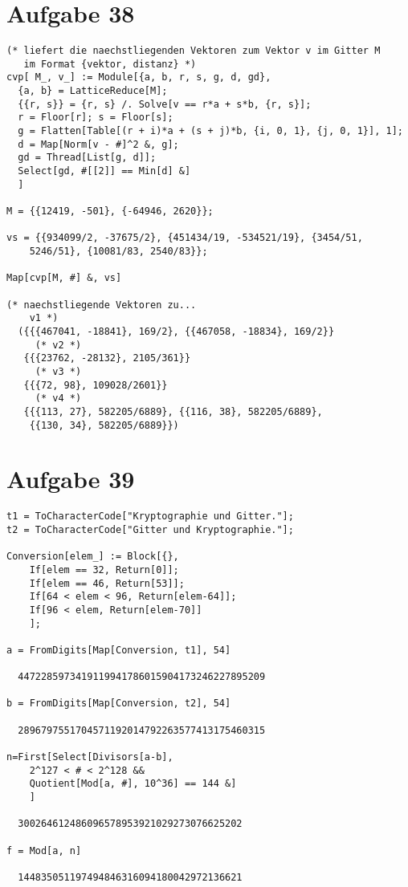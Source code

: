 \section*{Aufgabe 38}
\begin{lstlisting}
(* liefert die naechstliegenden Vektoren zum Vektor v im Gitter M 
   im Format {vektor, distanz} *)
cvp[ M_, v_] := Module[{a, b, r, s, g, d, gd},
  {a, b} = LatticeReduce[M];
  {{r, s}} = {r, s} /. Solve[v == r*a + s*b, {r, s}];
  r = Floor[r]; s = Floor[s];
  g = Flatten[Table[(r + i)*a + (s + j)*b, {i, 0, 1}, {j, 0, 1}], 1];
  d = Map[Norm[v - #]^2 &, g];
  gd = Thread[List[g, d]];
  Select[gd, #[[2]] == Min[d] &]
  ]

M = {{12419, -501}, {-64946, 2620}};

vs = {{934099/2, -37675/2}, {451434/19, -534521/19}, {3454/51, 
    5246/51}, {10081/83, 2540/83}};

Map[cvp[M, #] &, vs]

(* naechstliegende Vektoren zu...
	v1 *)
  ({{{467041, -18841}, 169/2}, {{467058, -18834}, 169/2}}
     (* v2 *)
   {{{23762, -28132}, 2105/361}}
     (* v3 *)
   {{{72, 98}, 109028/2601}}
     (* v4 *)
   {{{113, 27}, 582205/6889}, {{116, 38}, 582205/6889},
   	{{130, 34}, 582205/6889}})
\end{lstlisting}

\section*{Aufgabe 39}
\begin{lstlisting}
t1 = ToCharacterCode["Kryptographie und Gitter."];
t2 = ToCharacterCode["Gitter und Kryptographie."];

Conversion[elem_] := Block[{},
	If[elem == 32, Return[0]];
	If[elem == 46, Return[53]];
	If[64 < elem < 96, Return[elem-64]];
	If[96 < elem, Return[elem-70]]
	];

a = FromDigits[Map[Conversion, t1], 54]

  4472285973419119941786015904173246227895209

b = FromDigits[Map[Conversion, t2], 54]

  2896797551704571192014792263577413175460315

n=First[Select[Divisors[a-b],
	2^127 < # < 2^128 && 
	Quotient[Mod[a, #], 10^36] == 144 &]
	]

  300264612486096578953921029273076625202

f = Mod[a, n]

  144835051197494846316094180042972136621
\end{lstlisting}

